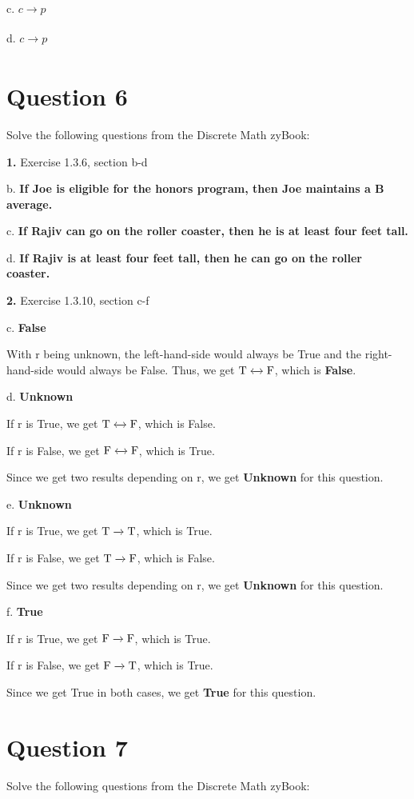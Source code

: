 \documentclass[11pt]{article}
\begin{document}
	c. $c\xrightarrow[]{}p$
	
	d. $c\xrightarrow[]{}p$
	
	\newpage
	\section*{Question 6}
	Solve the following questions from the Discrete Math zyBook:
	
	\textbf{1.} Exercise 1.3.6, section b-d
	\medskip
	
	b. \textbf{If Joe is eligible for the honors program, then Joe maintains a B average.}
	
	c. \textbf{If Rajiv can go on the roller coaster, then he is at least four feet tall.}
	
	d. \textbf{If Rajiv is at least four feet tall, then he can go on the roller coaster.}
	
	\vspace{3mm}
	\textbf{2.} Exercise 1.3.10, section c-f
	\medskip
	
	c. \textbf{False}
	
	With r being unknown, the left-hand-side would always be True and the right-hand-side would always be False. Thus, we get $\rm T\xleftrightarrow[]{}\rm F$, which is \textbf{False}.
	
	d. \textbf{Unknown}
	
	If r is True, we get $\rm T\xleftrightarrow[]{}\rm F$, which is False.
	
	If r is False, we get $\rm F\xleftrightarrow[]{}\rm F$, which is True.
	
	Since we get two results depending on r, we get \textbf{Unknown} for this question.
	
	e. \textbf{Unknown}
	
	If r is True, we get $\rm T\xrightarrow[]{}\rm T$, which is True.
	
	If r is False, we get $\rm T\xrightarrow[]{}\rm F$, which is False.
	
	Since we get two results depending on r, we get \textbf{Unknown} for this question.
	
	f. \textbf{True}
	
	If r is True, we get $\rm F\xrightarrow[]{}\rm F$, which is True.
	
	If r is False, we get $\rm F\xrightarrow[]{}\rm T$, which is True.
	
	Since we get True in both cases, we get \textbf{True} for this question.
	

	\newpage
	\section*{Question 7}
	Solve the following questions from the Discrete Math zyBook:
	
\end{document}
